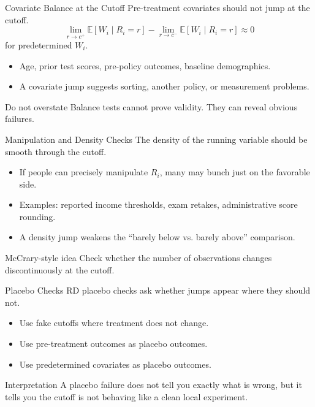 \documentclass[11pt,aspectratio=169]{beamer}
\newcommand{\E}{\mathbb{E}}
\newcommand{\derivbutton}[1]{\vspace{0.4em}\hfill\hyperlink{app:#1}{\beamerbutton{Appendix details}}}
\begin{document}
\begin{frame}{Covariate Balance at the Cutoff}
  Pre-treatment covariates should not jump at the cutoff.
  \[
    \lim_{r\to c^+}\E[W_i\mid R_i=r]
    -
    \lim_{r\to c^-}\E[W_i\mid R_i=r]
    \approx 0
  \]
  for predetermined \(W_i\).
  \begin{itemize}
    \item Age, prior test scores, pre-policy outcomes, baseline demographics.
    \item A covariate jump suggests sorting, another policy, or measurement problems.
  \end{itemize}
  \begin{block}{Do not overstate}
    Balance tests cannot prove validity. They can reveal obvious failures.
  \end{block}
\end{frame}

\begin{frame}{Manipulation and Density Checks}
  \hypertarget{main:density}{}
  The density of the running variable should be smooth through the cutoff.
  \begin{itemize}
    \item If people can precisely manipulate \(R_i\), many may bunch just on the favorable side.
    \item Examples: reported income thresholds, exam retakes, administrative score rounding.
    \item A density jump weakens the ``barely below vs. barely above'' comparison.
  \end{itemize}
  \begin{block}{McCrary-style idea}
    Check whether the number of observations changes discontinuously at the cutoff.
  \end{block}
  \derivbutton{density-check}
\end{frame}

\begin{frame}{Placebo Checks}
  RD placebo checks ask whether jumps appear where they should not.
  \begin{itemize}
    \item Use fake cutoffs where treatment does not change.
    \item Use pre-treatment outcomes as placebo outcomes.
    \item Use predetermined covariates as placebo outcomes.
  \end{itemize}
  \begin{block}{Interpretation}
    A placebo failure does not tell you exactly what is wrong, but it tells you the cutoff is not behaving like a clean local experiment.
  \end{block}
\end{frame}
\end{document}
